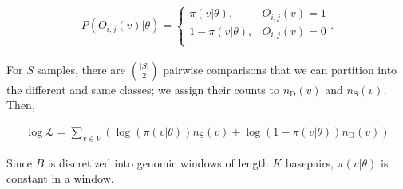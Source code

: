 \documentclass[11pt]{article}
\begin{document}
\begin{align}
  P(O_{i,j}(v) | \theta) = 
    \begin{cases}
      \pi(v | \theta), & O_{i,j}(v) = 1 \\
      1-\pi(v | \theta), & O_{i,j}(v) = 0 \\
    \end{cases}.
\end{align}

For $S$ samples, there are $|S| \choose 2$ pairwise comparisons that we can
partition into the different and same classes; we assign their counts to
$n_\text{D}(v)$ and $n_\text{S}(v)$. Then, 

\begin{align}
  \log\mathcal{L} = \sum_{v \in V} \left(\log(\pi(v | \theta)) n_\text{S}(v) + \log(1-\pi(v | \theta)) n_\text{D}(v)\right)
\end{align}

Since $B$ is discretized into genomic windows of length $K$ basepairs, $\pi(v |
\theta)$ is constant in a window.



\printbibliography
\end{document}
